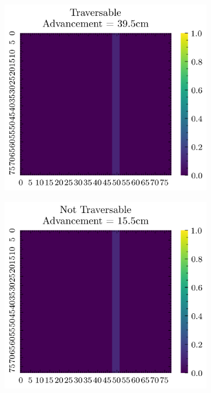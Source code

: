 \documentclass[../document.tex]{subfiles}
\begin{document}
\begin{figure}[H]
    \centering
    \begin{subfigure}[b]{0.33\textwidth}
        \includegraphics[width=\linewidth]{../img/5/custom_patches/walls_increasing/wall-height-1-2d.png}
    \end{subfigure}   
    \begin{subfigure}[b]{0.33\textwidth}
        \includegraphics[width=\linewidth]{../img/5/custom_patches/walls_increasing/wall-height-2-2d}

\end{subfigure}
\end{figure}
\end{document}
